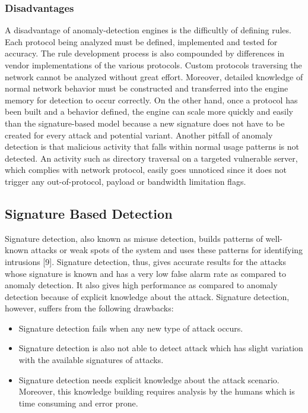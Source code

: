 \documentclass[12pt,a4paper]{report}
\begin{document}
\subsubsection{Disadvantages}
A disadvantage of anomaly-detection engines is the difficultly of defining rules. Each protocol being analyzed must be defined, implemented and tested for accuracy. The rule development process is also compounded by differences in vendor implementations of the various protocols. Custom protocols traversing the network cannot be analyzed without great effort. Moreover, detailed knowledge of normal network behavior must be constructed and transferred into the engine memory for detection to occur correctly. On the other hand, once a protocol has been built and a behavior defined, the engine can scale more quickly and easily than the signature-based model because a new signature does not have to be created for every attack and potential variant.
Another pitfall of anomaly detection is that malicious activity that falls within normal usage patterns is not detected. An activity such as directory traversal on a targeted vulnerable server, which complies with network protocol, easily goes unnoticed since it does not trigger any out-of-protocol, payload or bandwidth limitation flags.

\subsection{Signature Based Detection}
Signature detection, also known as misuse detection, builds patterns of well-known attacks or weak spots of the system and uses these patterns for identifying intrusions [9]. Signature detection, thus, gives accurate results for the attacks whose signature is known and has a very low false alarm rate as compared to anomaly detection. It also gives high performance as compared to anomaly detection because of explicit knowledge about the attack. Signature detection, however, suffers from the following drawbacks:
\begin{itemize}
\item Signature detection fails when any new type of attack occurs.
\item Signature detection is also not able to detect attack which has slight variation with the available signatures of attacks.
\item Signature detection needs explicit knowledge about the attack scenario. Moreover, this knowledge building requires analysis by the humans which is time consuming and error prone.
\end{itemize}
\newpage
\end{document}
